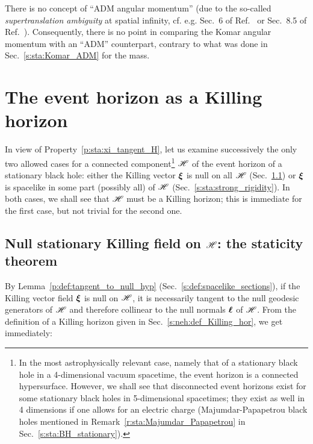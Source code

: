 \begin{remark}
There is no concept of ``ADM angular momentum'' (due to the so-called
\emph{supertranslation ambiguity} at spatial infinity, cf. e.g. Sec.~6 of Ref.~\cite{York79}
or Sec.~8.5 of Ref.~\cite{Gourg12}). Consequently, there is no point in comparing the Komar angular momentum
with an ``ADM'' counterpart, contrary to what was done in Sec.~\ref{s:sta:Komar_ADM} for the mass.
\end{remark}



\section{The event horizon as a Killing horizon} \label{s:sta:EH_KH}

In view of Property~\ref{p:sta:xi_tangent_H}, let us
examine successively the only two allowed cases for a
connected component\footnote{In the most astrophysically relevant case, namely
that of a stationary black hole in a 4-dimensional vacuum spacetime, the event horizon
is a connected hypersurface.
However, we shall see that disconnected event horizons exist for some stationary
black holes in 5-dimensional spacetimes; they exist as well in 4 dimensions if one allows
for an electric charge
(Majumdar-Papapetrou black holes mentioned in
Remark~\ref{r:sta:Majumdar_Papapetrou} in Sec.~\ref{s:sta:BH_stationary}).}
$\mathscr{H}$ of the event horizon of a stationary black hole:
either the Killing vector $\bm{\xi}$ is null on all $\mathscr{H}$
(Sec.~\ref{s:sta:staticity_thm}) or $\bm{\xi}$ is spacelike in some part
(possibly all) of $\mathscr{H}$ (Sec.~\ref{s:sta:strong_rigidity}).
In both cases, we shall see
that $\mathscr{H}$ must be a Killing horizon; this is immediate for the
first case, but not trivial for the second one.

\subsection{Null stationary Killing field on $\mathscr{H}$: the staticity theorem}\label{s:sta:staticity_thm}

By Lemma~\ref{p:def:tangent_to_null_hyp} (Sec.~\ref{s:def:spacelike_sections}),
if the Killing vector
field $\bm{\xi}$ is null on $\mathscr{H}$, it is necessarily tangent to the null geodesic generators
of $\mathscr{H}$ and therefore collinear to the null normals $\bm{\ell}$ of $\mathscr{H}$. From the definition
of a Killing horizon
given in Sec.~\ref{s:neh:def_Killing_hor}, we get immediately:

